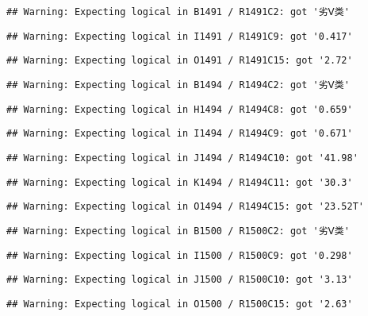 \documentclass[
]{article}
\begin{document}
\begin{verbatim}
## Warning: Expecting logical in B1491 / R1491C2: got '劣Ⅴ类'
\end{verbatim}

\begin{verbatim}
## Warning: Expecting logical in I1491 / R1491C9: got '0.417'
\end{verbatim}

\begin{verbatim}
## Warning: Expecting logical in O1491 / R1491C15: got '2.72'
\end{verbatim}

\begin{verbatim}
## Warning: Expecting logical in B1494 / R1494C2: got '劣Ⅴ类'
\end{verbatim}

\begin{verbatim}
## Warning: Expecting logical in H1494 / R1494C8: got '0.659'
\end{verbatim}

\begin{verbatim}
## Warning: Expecting logical in I1494 / R1494C9: got '0.671'
\end{verbatim}

\begin{verbatim}
## Warning: Expecting logical in J1494 / R1494C10: got '41.98'
\end{verbatim}

\begin{verbatim}
## Warning: Expecting logical in K1494 / R1494C11: got '30.3'
\end{verbatim}

\begin{verbatim}
## Warning: Expecting logical in O1494 / R1494C15: got '23.52T'
\end{verbatim}

\begin{verbatim}
## Warning: Expecting logical in B1500 / R1500C2: got '劣Ⅴ类'
\end{verbatim}

\begin{verbatim}
## Warning: Expecting logical in I1500 / R1500C9: got '0.298'
\end{verbatim}

\begin{verbatim}
## Warning: Expecting logical in J1500 / R1500C10: got '3.13'
\end{verbatim}

\begin{verbatim}
## Warning: Expecting logical in O1500 / R1500C15: got '2.63'
\end{verbatim}
\end{document}

